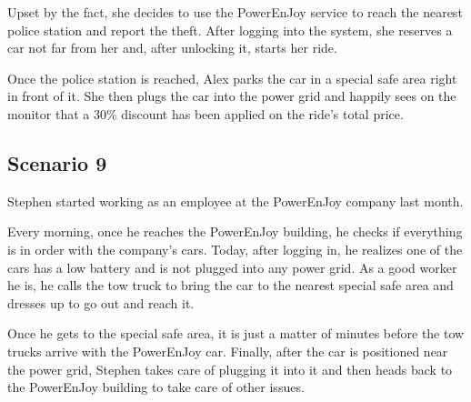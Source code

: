 Upset by the fact, she decides to use the PowerEnJoy service to reach the nearest police station and report the theft. After logging into the system, she reserves a car not far from her and, after unlocking it, starts her ride. 

Once the police station is reached, Alex parks the car in a special safe area right in front of it. She then plugs the car into the power grid and happily sees on the monitor that a 30\% discount has been applied on the ride's total price.
\subsection{Scenario 9}
Stephen started working as an employee at the PowerEnJoy company last month. 

Every morning, once he reaches the PowerEnJoy building, he checks if everything is in order with the company's cars. Today, after logging in, he realizes one of the cars has a low battery and is not plugged into any power grid. As a good worker he is, he calls the tow truck to bring the car to the nearest special safe area and dresses up to go out and reach it. 

Once he gets to the special safe area, it is just a matter of minutes before the tow trucks arrive with the PowerEnJoy car. Finally, after the car is positioned near the power grid, Stephen takes care of plugging it into it and then heads back to the PowerEnJoy building to take care of other issues.